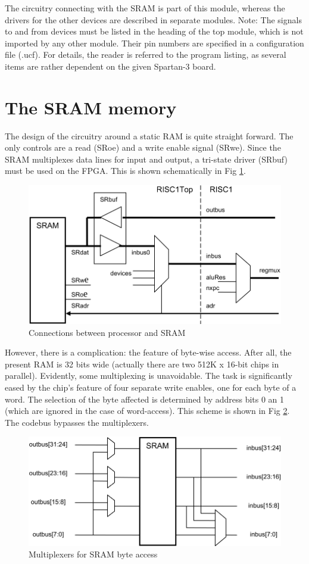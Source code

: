 The circuitry connecting with the SRAM is part of this module, whereas the drivers for the other
devices are described in separate modules. Note: The signals to and from devices must be listed in
the heading of the top module, which is not imported by any other module. Their pin numbers are
specified in a configuration file (.ucf). For details, the reader is referred to the program listing, as
several items are rather dependent on the given Spartan-3 board.

\section{The SRAM memory}
The design of the circuitry around a static RAM is quite straight forward. The only controls are a
read (SRoe) and a write enable signal (SRwe). Since the SRAM multiplexes data lines for input and
output, a tri-state driver (SRbuf) must be used on the FPGA. This is shown schematically in Fig \ref{fig:conn}.
\begin{figure}[h!]
  \centering
  \includegraphics[width=\textwidth]{i/G/1.png}
  \caption{Connections between processor and SRAM}
  \label{fig:conn}
\end{figure}

However, there is a complication: the feature of byte-wise access. After all, the present RAM is 32
bits wide (actually there are two 512K x 16-bit chips in parallel). Evidently, some multiplexing is
unavoidable. The task is significantly eased by the chip's feature of four separate write enables,
one for each byte of a word. The selection of the byte affected is determined by address bits 0 an 1
(which are ignored in the case of word-access). This scheme is shown in Fig \ref{fig:sram}. The
codebus bypasses the multiplexers.
\begin{figure}[h!]
  \centering
  \includegraphics[width=.9\textwidth]{i/G/2.png}
  \caption{Multiplexers for SRAM byte access}
  \label{fig:sram}
\end{figure}

